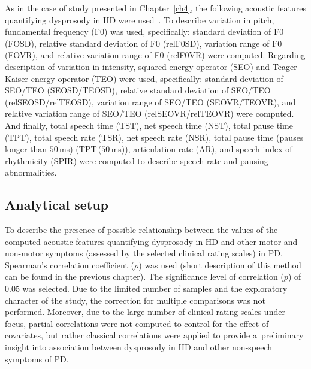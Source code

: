 As in the case of study presented in Chapter~\ref{ch4}, the following acoustic features quantifying dysprosody in HD were used~\cite{Brabenec2017}. To describe variation in pitch, fundamental frequency (F0) was used, specifically: standard deviation of F0 (FOSD), relative standard deviation of F0 (relF0SD), variation range of F0 (FOVR), and relative variation range of F0 (relF0VR) were computed. Regarding description of variation in intensity, squared energy operator (SEO) and Teager-Kaiser energy operator (TEO) were used, specifically: standard deviation of SEO/TEO (SEOSD/TEOSD), relative standard deviation of SEO/TEO (relSEOSD/relTEOSD), variation range of SEO/TEO (SEOVR/TEOVR), and relative variation range of SEO/TEO (relSEOVR/relTEOVR) were computed. And finally, total speech time (TST), net speech time (NST), total pause time (TPT), total speech rate (TSR), net speech rate (NSR), total pause time (pauses longer than $50$\,ms) (TPT\,($50$\,ms)), articulation rate (AR), and speech index of rhythmicity (SPIR) were computed to describe speech rate and pausing abnormalities.

\subsection{Analytical setup}
\label{ch5_3_3}

To describe the presence of possible relationship between the values of the computed acoustic features quantifying dysprosody in HD and other motor and non-motor symptoms (assessed by the selected clinical rating scales) in PD, Spearman's correlation coefficient ($\rho$) was used (short description of this method can be found in the previous chapter). The significance level of correlation ($p$) of $0.05$ was selected. Due to the limited number of samples and the exploratory character of the study, the correction for multiple comparisons was not performed. Moreover, due to the large number of clinical rating scales under focus, partial correlations were not computed to control for the effect of covariates, but rather classical correlations were applied to provide a~preliminary insight into association between dysprosody in HD and other non-speech symptoms of PD.

